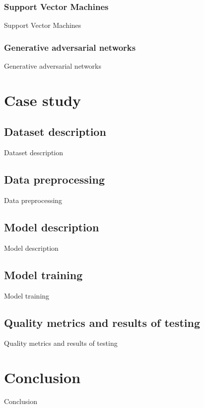 \documentclass{article}
\theoremstyle{definition}
\begin{document}
\subsubsection{Support Vector Machines}
Support Vector Machines

\subsubsection{Generative adversarial networks}
Generative adversarial networks

\section{Case study}

\subsection{Dataset description}
Dataset description

\subsection{Data preprocessing}
Data preprocessing

\subsection{Model description}
Model description

\subsection{Model training}
Model training

\subsection{Quality metrics and results of testing}
Quality metrics and results of testing

\section{Conclusion}
Conclusion


\end{document}
